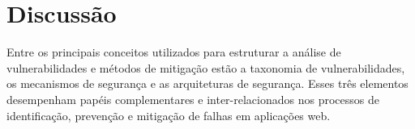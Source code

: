 \section{
    Discussão
} \label{sec:discussao}

Entre os principais conceitos utilizados para estruturar a análise de vulnerabilidades e métodos de mitigação estão a taxonomia de vulnerabilidades, os mecanismos de segurança e as arquiteturas de segurança. Esses três elementos desempenham papéis complementares e inter-relacionados nos processos de identificação, prevenção e mitigação de falhas em aplicações web. 



